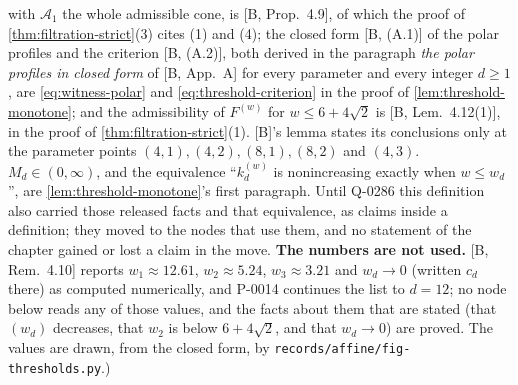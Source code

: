 \begin{definition}
{with $\mathcal{A}_1$ the whole admissible cone, is [B, Prop.~4.9], of which the proof of
\ref{thm:filtration-strict}(3) cites (1) and (4); the closed form [B, (A.1)] of the polar profiles and the
criterion [B, (A.2)], both derived in the paragraph \emph{the polar profiles in closed form} of
[B, App.~A] for every parameter and every integer $d \ge 1$, are \ref{eq:witness-polar} and
\ref{eq:threshold-criterion} in the proof of \ref{lem:threshold-monotone}; and the admissibility
of $F^{(w)}$ for $w \le 6 + 4\sqrt2$ is [B, Lem.~4.12(1)], in the proof of
\ref{thm:filtration-strict}(1). [B]'s lemma states its conclusions only at the parameter points
$(4,1), (4,2), (8,1), (8,2)$ and $(4,3)$. $M_d \in (0,\infty)$, and the equivalence ``$k^{(w)}_d$
is nonincreasing exactly when $w \le w_d$'', are \ref{lem:threshold-monotone}'s first paragraph.
Until Q-0286 this definition also carried those released facts and that equivalence, as claims
inside a definition; they moved to the nodes that use them, and no statement of the chapter gained
or lost a claim in the move. \textbf{The numbers are not used.} [B, Rem.~4.10] reports
$w_1 \approx 12.61$, $w_2 \approx 5.24$, $w_3 \approx 3.21$ and $w_d \to 0$ (written $c_d$ there) as
computed numerically, and P-0014 continues the list to $d = 12$; no node below reads any of those values,
and the facts about them that are stated (that $(w_d)$ decreases, that $w_2$ is below
$6 + 4\sqrt2$, and that $w_d \to 0$) are proved. The values are drawn, from the closed form, by
\texttt{records/affine/fig-thresholds.py}.)}
\end{definition}

